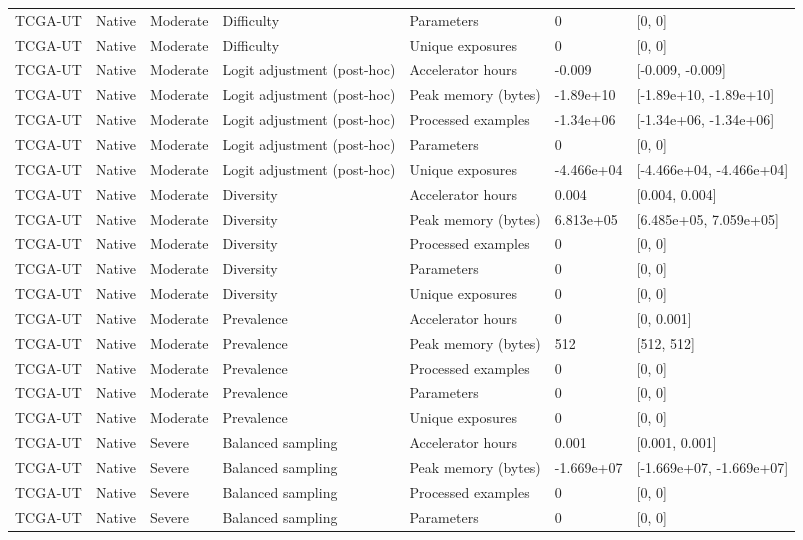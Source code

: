 \begin{longtable}{lllllll}
TCGA-UT & Native & Moderate & Difficulty & Parameters & 0 & [0, 0] \\
TCGA-UT & Native & Moderate & Difficulty & Unique exposures & 0 & [0, 0] \\
TCGA-UT & Native & Moderate & Logit adjustment (post-hoc) & Accelerator hours & -0.009 & [-0.009, -0.009] \\
TCGA-UT & Native & Moderate & Logit adjustment (post-hoc) & Peak memory (bytes) & -1.89e+10 & [-1.89e+10, -1.89e+10] \\
TCGA-UT & Native & Moderate & Logit adjustment (post-hoc) & Processed examples & -1.34e+06 & [-1.34e+06, -1.34e+06] \\
TCGA-UT & Native & Moderate & Logit adjustment (post-hoc) & Parameters & 0 & [0, 0] \\
TCGA-UT & Native & Moderate & Logit adjustment (post-hoc) & Unique exposures & -4.466e+04 & [-4.466e+04, -4.466e+04] \\
TCGA-UT & Native & Moderate & Diversity & Accelerator hours & 0.004 & [0.004, 0.004] \\
TCGA-UT & Native & Moderate & Diversity & Peak memory (bytes) & 6.813e+05 & [6.485e+05, 7.059e+05] \\
TCGA-UT & Native & Moderate & Diversity & Processed examples & 0 & [0, 0] \\
TCGA-UT & Native & Moderate & Diversity & Parameters & 0 & [0, 0] \\
TCGA-UT & Native & Moderate & Diversity & Unique exposures & 0 & [0, 0] \\
TCGA-UT & Native & Moderate & Prevalence & Accelerator hours & 0 & [0, 0.001] \\
TCGA-UT & Native & Moderate & Prevalence & Peak memory (bytes) & 512 & [512, 512] \\
TCGA-UT & Native & Moderate & Prevalence & Processed examples & 0 & [0, 0] \\
TCGA-UT & Native & Moderate & Prevalence & Parameters & 0 & [0, 0] \\
TCGA-UT & Native & Moderate & Prevalence & Unique exposures & 0 & [0, 0] \\
TCGA-UT & Native & Severe & Balanced sampling & Accelerator hours & 0.001 & [0.001, 0.001] \\
TCGA-UT & Native & Severe & Balanced sampling & Peak memory (bytes) & -1.669e+07 & [-1.669e+07, -1.669e+07] \\
TCGA-UT & Native & Severe & Balanced sampling & Processed examples & 0 & [0, 0] \\
TCGA-UT & Native & Severe & Balanced sampling & Parameters & 0 & [0, 0] \\

\end{longtable}
